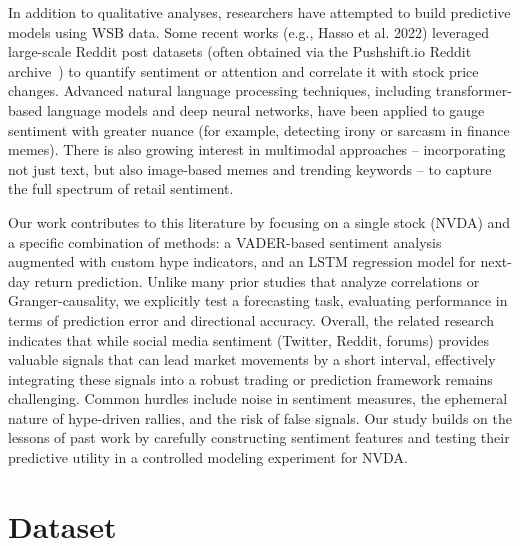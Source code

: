 \documentclass[conference]{IEEEtran}
\begin{document}
In addition to qualitative analyses, researchers have attempted to build predictive models using WSB data. Some recent works (e.g., Hasso et al. 2022) leveraged large-scale Reddit post datasets (often obtained via the Pushshift.io Reddit archive~\cite{baumgartner2020pushshift}) to quantify sentiment or attention and correlate it with stock price changes. Advanced natural language processing techniques, including transformer-based language models and deep neural networks, have been applied to gauge sentiment with greater nuance (for example, detecting irony or sarcasm in finance memes). There is also growing interest in multimodal approaches – incorporating not just text, but also image-based memes and trending keywords – to capture the full spectrum of retail sentiment.

Our work contributes to this literature by focusing on a single stock (NVDA) and a specific combination of methods: a VADER-based sentiment analysis augmented with custom hype indicators, and an LSTM regression model for next-day return prediction. Unlike many prior studies that analyze correlations or Granger-causality, we explicitly test a forecasting task, evaluating performance in terms of prediction error and directional accuracy. Overall, the related research indicates that while social media sentiment (Twitter, Reddit, forums) provides valuable signals that can lead market movements by a short interval, effectively integrating these signals into a robust trading or prediction framework remains challenging. Common hurdles include noise in sentiment measures, the ephemeral nature of hype-driven rallies, and the risk of false signals. Our study builds on the lessons of past work by carefully constructing sentiment features and testing their predictive utility in a controlled modeling experiment for NVDA.

\section{Dataset}
\end{document}
